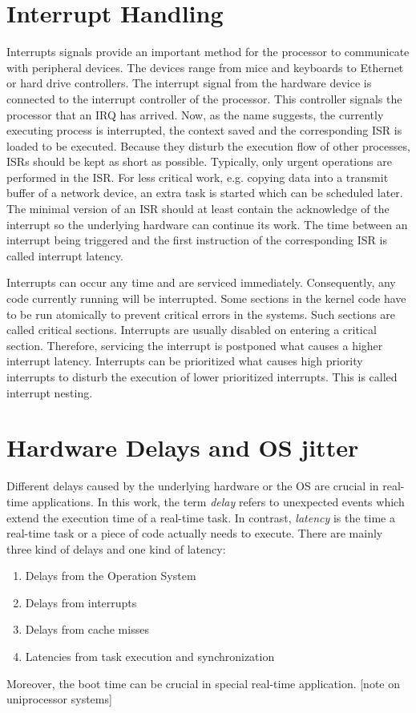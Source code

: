 \section{Interrupt Handling}\label{s_interrupt_handling}
Interrupts signals provide an important method for the processor to communicate with peripheral devices.
The devices range from mice and keyboards to Ethernet or hard drive controllers.
The interrupt signal from the hardware device is connected to the interrupt controller of the processor. 
This controller signals the processor that an \ac{IRQ} has arrived.
Now, as the name suggests, the currently executing process is interrupted, the context saved and the corresponding \ac{ISR} is loaded to be executed.
Because they disturb the execution flow of other processes, \acp{ISR} should be kept as short as possible.
Typically, only urgent operations are performed in the \ac{ISR}. 
For less critical work, e.g. copying data into a transmit buffer of a network device, an extra task is started which can be scheduled later.
The minimal version of an \ac{ISR} should at least contain the acknowledge of the interrupt so the underlying hardware can continue its work.
The time between an interrupt being triggered and the first instruction of the corresponding \ac{ISR} is called interrupt latency.
\par
Interrupts can occur any time and are serviced immediately.
Consequently, any code currently running will be interrupted.
Some sections in the kernel code have to be run atomically to prevent critical errors in the systems.
Such sections are called critical sections.
Interrupts are usually disabled on entering a critical section.
Therefore, servicing the interrupt is postponed what causes a higher interrupt latency.
Interrupts can be prioritized what causes high priority interrupts to disturb the execution of lower prioritized interrupts.
This is called interrupt nesting.
 
\section{Hardware Delays and \ac{OS} jitter}
Different delays caused by the underlying hardware or the \ac{OS} are crucial in real-time applications.
In this work, the term \textit{delay} refers to unexpected events which extend the execution time of a real-time task.
In contrast, \textit{latency} is the time a real-time task or a piece of code actually needs to execute. 
There are mainly three kind of delays and one kind of latency:
\begin{enumerate}
	\item Delays from the Operation System
	\item Delays from interrupts
	\item Delays from cache misses
	\item Latencies from task execution and synchronization
\end{enumerate}
Moreover, the boot time can be crucial in special real-time application.
[note on uniprocessor systems]

